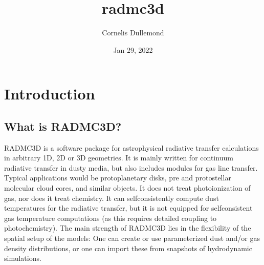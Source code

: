 \documentclass[letterpaper,10pt,english]{sphinxmanual}
\title{radmc3d}
\date{Jan 29, 2022}
\author{Cornelis Dullemond}
\begin{document}
\pagestyle{empty}
\sphinxmaketitle
\pagestyle{plain}
\sphinxtableofcontents
\pagestyle{normal}
\label{\detokenize{index::doc}}



\chapter{Introduction}
\label{\detokenize{introduction:introduction}}\label{\detokenize{introduction::doc}}

\section{What is RADMC\sphinxhyphen{}3D?}
\label{\detokenize{introduction:what-is-radmc-3d}}
RADMC\sphinxhyphen{}3D is a software package for astrophysical radiative transfer calculations
in arbitrary 1\sphinxhyphen{}D, 2\sphinxhyphen{}D or 3\sphinxhyphen{}D geometries. It is mainly written for continuum
radiative transfer in dusty media, but also includes modules for gas line
transfer. Typical applications would be protoplanetary disks, pre\sphinxhyphen{} and
proto\sphinxhyphen{}stellar molecular cloud cores, and similar objects. It does not treat
photoionization of gas, nor does it treat chemistry. It can self\sphinxhyphen{}consistently
compute dust temperatures for the radiative transfer, but it is not equipped for
self\sphinxhyphen{}consistent gas temperature computations (as this requires detailed coupling
to photochemistry). The main strength of RADMC\sphinxhyphen{}3D lies in the flexibility of the
spatial setup of the models: One can create or use parameterized dust and/or gas
density distributions, or one can import these from snapshots of hydrodynamic
simulations.
\end{document}
